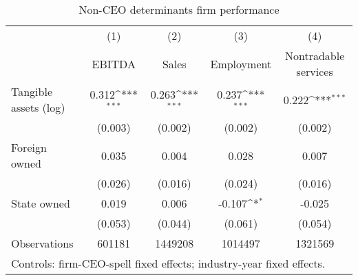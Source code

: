 \begin{table}[htbp]\centering
\def\sym#1{\ifmmode^{#1}\else\(^{#1}\)\fi}
\caption{Non-CEO determinants firm performance}
\begin{tabular}{l*{4}{c}}
\hline\hline
                    &\multicolumn{1}{c}{(1)}&\multicolumn{1}{c}{(2)}&\multicolumn{1}{c}{(3)}&\multicolumn{1}{c}{(4)}\\
                    &\multicolumn{1}{c}{EBITDA}&\multicolumn{1}{c}{Sales}&\multicolumn{1}{c}{Employment}&\multicolumn{1}{c}{Nontradable services}\\
\hline
Tangible assets (log)&       0.312\sym{***}&       0.263\sym{***}&       0.237\sym{***}&       0.222\sym{***}\\
                    &     (0.003)         &     (0.002)         &     (0.002)         &     (0.002)         \\
[1em]
Foreign owned       &       0.035         &       0.004         &       0.028         &       0.007         \\
                    &     (0.026)         &     (0.016)         &     (0.024)         &     (0.016)         \\
[1em]
State owned         &       0.019         &       0.006         &      -0.107\sym{*}  &      -0.025         \\
                    &     (0.053)         &     (0.044)         &     (0.061)         &     (0.054)         \\
\hline
Observations        &      601181         &     1449208         &     1014497         &     1321569         \\
\hline\hline
\multicolumn{5}{l}{\footnotesize Controls: firm-CEO-spell fixed effects; industry-year fixed effects.}\\
\end{tabular}
\end{table}
